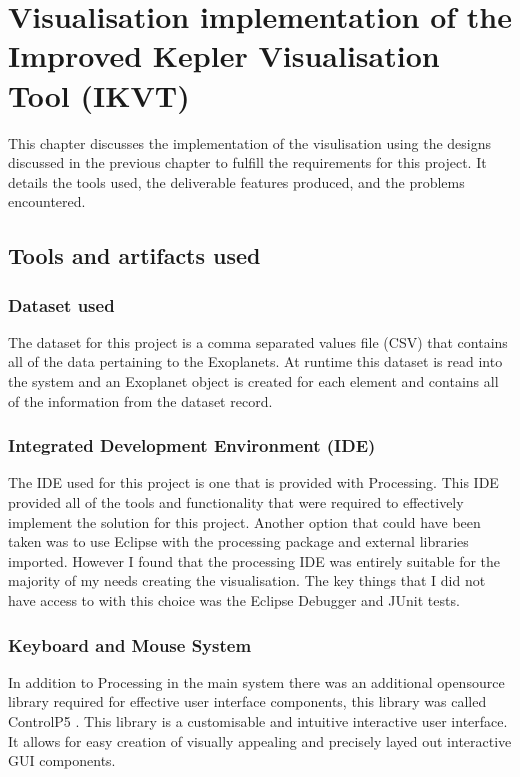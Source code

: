 \chapter{Visualisation implementation of the Improved Kepler Visualisation Tool
(IKVT)}\label{C:sd}
This chapter discusses the implementation of the visulisation using the designs
discussed in the previous chapter to fulfill the requirements for this project.
It details the tools used, the deliverable features
produced, and the problems encountered. 

\section{Tools and artifacts used}
\subsection{Dataset used}
The dataset for this project is a comma separated values file (CSV) that
contains all of the data pertaining to the Exoplanets. At runtime this dataset
is read into the system and an Exoplanet object is created for each element and
contains all of the information from the dataset record.

\subsection{Integrated Development Environment (IDE)}
The IDE used for this project is one that is provided with Processing. This IDE
provided all of the tools and functionality that were required to effectively
implement the solution for this project. Another option that could have been
taken was to use Eclipse with the processing package and external libraries
imported. However I found that the processing IDE was entirely suitable for the
majority of my needs creating the visualisation. The key things that I did not
have access to with this choice was the Eclipse Debugger and JUnit tests.
\subsection{Keyboard and Mouse System}
In addition to Processing in the main system there was an additional opensource
library required for effective user interface components, this library was
called ControlP5 \cite{controlp5}. This library is a customisable and intuitive
interactive
user interface. It allows for easy creation of visually appealing and precisely
layed out interactive GUI components.


